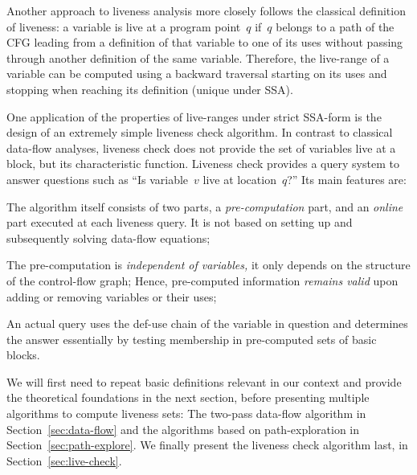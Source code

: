 Another approach to liveness analysis more closely follows the classical definition of liveness:
a variable is live at a program point~$q$ if~$q$ belongs to a path of the CFG leading from a definition of that variable to one of its uses without passing through another definition of the same variable.
Therefore, the live-range of a variable can be computed using a backward traversal starting on its uses and stopping when reaching its definition (unique under SSA).

One application of the properties of live-ranges under strict SSA-form is the design of an extremely simple liveness check algorithm.
In contrast to classical data-flow analyses, liveness check does not provide the set of variables live at a block, but its characteristic function.
Liveness check provides a query system to answer questions such as ``Is variable~$v$ live at location~$q$?''
Its main features are:
\begin{compactenum}
\item
	The algorithm itself consists of two parts, a \emph{pre-computation} part, and an \emph{online} part executed at each liveness query.
	It is not based on setting up and subsequently solving data-flow equations;
\item
	The pre-computation is \emph{independent of variables,} it only depends on the structure of the control-flow graph;
	Hence, pre-computed information \emph{remains valid} upon adding or removing variables or their uses;
\item
	An actual query uses the def-use chain of the variable in question and determines the answer essentially by testing membership in pre-computed sets of basic blocks.
\end{compactenum}

We will first need to repeat basic definitions relevant in our context and provide the theoretical foundations in the next section, before presenting multiple algorithms to compute liveness sets: The two-pass data-flow algorithm in Section~\ref{sec:data-flow} and the algorithms based on path-exploration in Section~\ref{sec:path-explore}.
We finally present the liveness check algorithm last, in Section~\ref{sec:live-check}.

